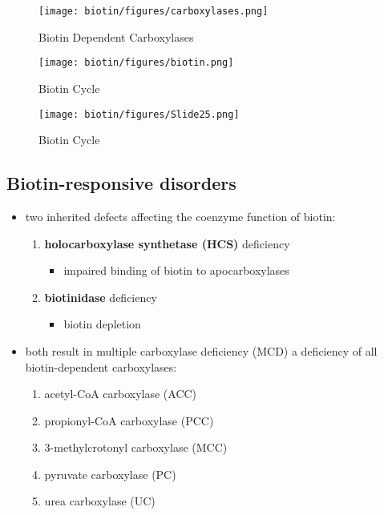 \documentclass{scrartcl}
\begin{document}
\begin{figure}[htbp]
\centering
\texttt{[image: biotin/figures/carboxylases.png]}
\caption{\label{fig:orgf621825}Biotin Dependent Carboxylases}
\end{figure}

\begin{figure}[htbp]
\centering
\texttt{[image: biotin/figures/biotin.png]}
\caption{\label{fig:orgda17463}Biotin Cycle}
\end{figure}

\begin{figure}[htbp]
\centering
\texttt{[image: biotin/figures/Slide25.png]}
\caption{\label{fig:orga4ee3d5}Biotin Cycle}
\end{figure}

\subsection{Biotin-responsive disorders}
\label{sec:org719ee57}
\begin{itemize}
\item two inherited defects affecting the coenzyme function of biotin:
\begin{enumerate}
\item \textbf{holocarboxylase synthetase (HCS)} deficiency
\begin{itemize}
\item impaired binding of biotin to apocarboxylases
\end{itemize}
\item \textbf{biotinidase} deficiency
\begin{itemize}
\item biotin depletion
\end{itemize}
\end{enumerate}

\item both result in multiple carboxylase deficiency (MCD) a deficiency of
all biotin-dependent carboxylases:
\begin{enumerate}
\item acetyl-CoA carboxylase (ACC)
\item propionyl-CoA carboxylase (PCC)
\item 3-methylcrotonyl carboxylase (MCC)
\item pyruvate carboxylase (PC)
\item urea carboxylase (UC)
\end{enumerate}
\end{itemize}
\end{document}
